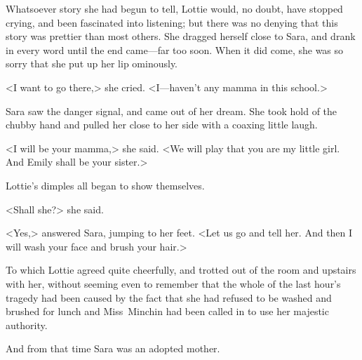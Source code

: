 Whatsoever story she had begun to tell, Lottie would, no doubt, have stopped crying, and been fascinated into listening; but there was no denying that this story was prettier than most others. She dragged herself close to Sara, and drank in every word until the end came—far too soon. When it did come, she was so sorry that she put up her lip ominously.

<I want to go there,> she cried. <I—haven't any mamma in this school.>

Sara saw the danger signal, and came out of her dream. She took hold of the chubby hand and pulled her close to her side with a coaxing little laugh.

<I will be your mamma,> she said. <We will play that you are my little girl. And Emily shall be your sister.>

Lottie's dimples all began to show themselves.

<Shall she?> she said.

<Yes,> answered Sara, jumping to her feet. <Let us go and tell her. And then I will wash your face and brush your hair.>

To which Lottie agreed quite cheerfully, and trotted out of the room and upstairs with her, without seeming even to remember that the whole of the last hour's tragedy had been caused by the fact that she had refused to be washed and brushed for lunch and Miss~Minchin had been called in to use her majestic authority.

And from that time Sara was an adopted mother.

\begin{a4}
	\enlargethispage{\baselineskip}
\end{a4}
